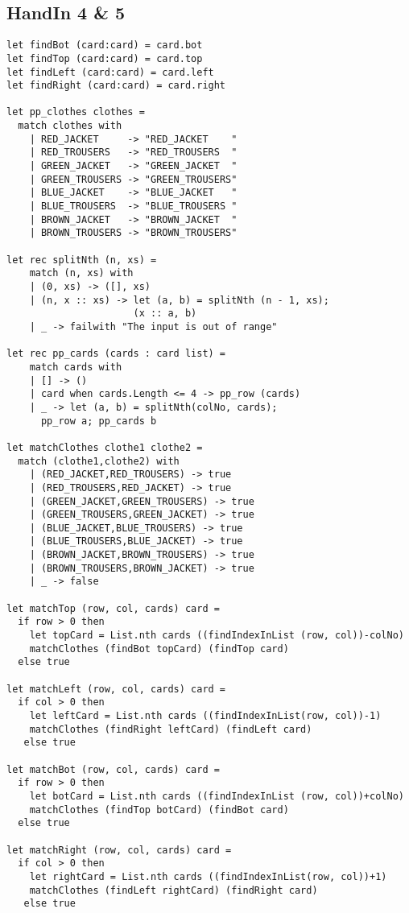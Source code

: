\subsection{HandIn 4 \& 5}
\label{Appendix_FSharp_Grooss_4and5}
\begin{lstlisting}
let findBot (card:card) = card.bot
let findTop (card:card) = card.top
let findLeft (card:card) = card.left
let findRight (card:card) = card.right

let pp_clothes clothes =
  match clothes with
    | RED_JACKET     -> "RED_JACKET    "
    | RED_TROUSERS   -> "RED_TROUSERS  "
    | GREEN_JACKET   -> "GREEN_JACKET  "
    | GREEN_TROUSERS -> "GREEN_TROUSERS"
    | BLUE_JACKET    -> "BLUE_JACKET   "
    | BLUE_TROUSERS  -> "BLUE_TROUSERS "
    | BROWN_JACKET   -> "BROWN_JACKET  "
    | BROWN_TROUSERS -> "BROWN_TROUSERS"

let rec splitNth (n, xs) = 
    match (n, xs) with
    | (0, xs) -> ([], xs)
    | (n, x :: xs) -> let (a, b) = splitNth (n - 1, xs);
                      (x :: a, b)
    | _ -> failwith "The input is out of range"

let rec pp_cards (cards : card list) = 
    match cards with
    | [] -> ()
    | card when cards.Length <= 4 -> pp_row (cards)
    | _ -> let (a, b) = splitNth(colNo, cards);
      pp_row a; pp_cards b

let matchClothes clothe1 clothe2 =
  match (clothe1,clothe2) with
    | (RED_JACKET,RED_TROUSERS) -> true
    | (RED_TROUSERS,RED_JACKET) -> true
    | (GREEN_JACKET,GREEN_TROUSERS) -> true
    | (GREEN_TROUSERS,GREEN_JACKET) -> true
    | (BLUE_JACKET,BLUE_TROUSERS) -> true
    | (BLUE_TROUSERS,BLUE_JACKET) -> true
    | (BROWN_JACKET,BROWN_TROUSERS) -> true
    | (BROWN_TROUSERS,BROWN_JACKET) -> true
    | _ -> false

let matchTop (row, col, cards) card =
  if row > 0 then
    let topCard = List.nth cards ((findIndexInList (row, col))-colNo)
    matchClothes (findBot topCard) (findTop card)
  else true

let matchLeft (row, col, cards) card =
  if col > 0 then
    let leftCard = List.nth cards ((findIndexInList(row, col))-1)
    matchClothes (findRight leftCard) (findLeft card)
   else true

let matchBot (row, col, cards) card = 
  if row > 0 then
    let botCard = List.nth cards ((findIndexInList (row, col))+colNo)
    matchClothes (findTop botCard) (findBot card)
  else true

let matchRight (row, col, cards) card =
  if col > 0 then
    let rightCard = List.nth cards ((findIndexInList(row, col))+1)
    matchClothes (findLeft rightCard) (findRight card)
   else true


\end{lstlisting}
